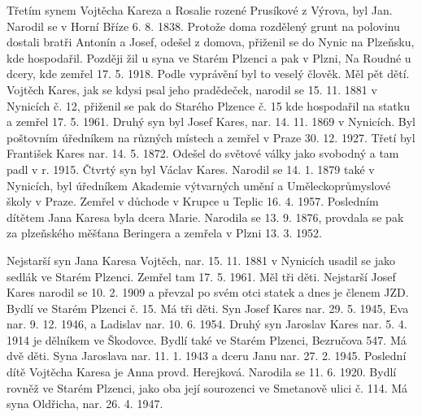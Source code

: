 \documentclass[../dejiny-rodu-prusiku.tex]{subfiles}
\begin{document}
Třetím synem Vojtěcha Kareza a Rosalie rozené Prusíkové z Výrova, byl Jan. Narodil se v Horní Bříze 6. 8. 1838. Protože doma rozdělený grunt na polovinu dostali bratři Antonín a Josef, odešel z domova, přiženil se do Nynic na Plzeňsku, kde hospodařil. Později žil u syna ve Starém Plzenci a pak v Plzni, Na Roudné u dcery, kde zemřel 17. 5. 1918. Podle vyprávění byl to veselý člověk. Měl pět dětí. Vojtěch Kares, jak se kdysi psal jeho pradědeček, narodil se 15. 11. 1881 v Nynicích č. 12, přiženil se pak do Starého Plzence č. 15 kde hospodařil na statku a zemřel 17. 5. 1961. Druhý syn byl Josef Kares, nar. 14. 11. 1869 v Nynicích. Byl poštovním úředníkem na různých místech a
zemřel v Praze 30. 12. 1927. Třetí byl František Kares nar. 14. 5. 1872. Odešel do světové války jako svobodný a tam padl v r. 1915. Čtvrtý syn byl Václav Kares. Na­rodil se 14. 1. 1879 také v Nynicích, byl úředníkem Akademie výtvarných umění a Uměleckoprůmyslové školy v Praze. Zemřel v důchode v Krupce u Teplic 16. 4. 1957. Posledním dítětem Jana Karesa byla dcera Marie. Narodila se 13. 9. 1876, provdala se pak za plzeňského měšťana Beringera a zemřela v Plzni 13. 3. 1952.

Nejstarší syn Jana Karesa Vojtěch, nar. 15. 11. 1881 v Nynicích usadil se jako sedlák ve Starém Plzenci. Zemřel tam 17. 5. 1961. Měl tři děti. Nejstarší Josef Kares narodil se 10. 2. 1909 a převzal po svém otci statek a dnes je členem JZD. Bydlí ve Starém Plzenci č. 15. Má tři děti. Syn Josef Kares nar. 29. 5. 1945, Eva nar. 9. 12. 1946, a Ladislav nar. 10. 6. 1954. Druhý syn Jaroslav Kares nar. 5. 4. 1914 je dělníkem ve Škodovce. Bydlí také ve Starém Plzenci, Bezručova 547. Má dvě děti. Syna Jaroslava nar. 11. 1. 1943 a dceru Janu nar. 27. 2. 1945. Poslední dítě Vojtěcha Karesa je Anna provd. Herejková. Narodila se 11. 6. 1920. Bydlí rovněž ve Starém Plzenci, jako oba její sourozenci ve Smetanově ulici č. 114. Má syna Oldřicha, nar. 26. 4. 1947.
\end{document}
